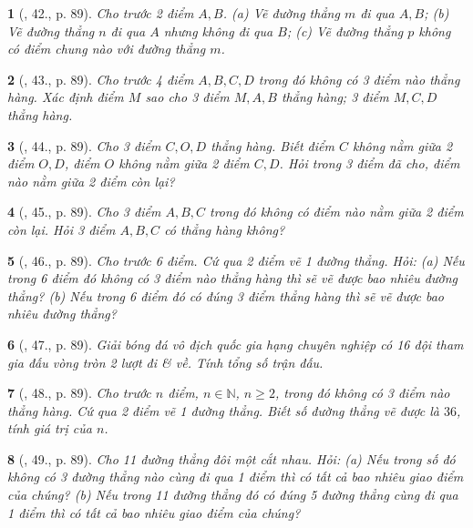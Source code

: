 \documentclass{article}
\newtheorem{baitoan}{}
\begin{document}
\begin{baitoan}[\cite{Tuyen_Toan_6}, 42., p. 89]
	Cho trước 2 điểm $A,B$. (a) Vẽ đường thẳng $m$ đi qua $A,B$; (b) Vẽ đường thẳng $n$ đi qua $A$ nhưng không đi qua $B$; (c) Vẽ đường thẳng $p$ không có điểm chung nào với đường thẳng $m$.
\end{baitoan}

\begin{baitoan}[\cite{Tuyen_Toan_6}, 43., p. 89]
	Cho trước 4 điểm $A,B,C,D$ trong đó không có 3 điểm nào thẳng hàng. Xác định điểm $M$ sao cho 3 điểm $M,A,B$ thẳng hàng; 3 điểm $M,C,D$ thẳng hàng.
\end{baitoan}

\begin{baitoan}[\cite{Tuyen_Toan_6}, 44., p. 89]
	Cho 3 điểm $C,O,D$ thẳng hàng. Biết điểm $C$ không nằm giữa 2 điểm $O,D$, điểm $O$ không nằm giữa 2 điểm $C,D$. Hỏi trong 3 điểm đã cho, điểm nào nằm giữa 2 điểm còn lại?
\end{baitoan}

\begin{baitoan}[\cite{Tuyen_Toan_6}, 45., p. 89]
	Cho 3 điểm $A,B,C$ trong đó không có điểm nào nằm giữa 2 điểm còn lại. Hỏi 3 điểm $A,B,C$ có thẳng hàng không?
\end{baitoan}

\begin{baitoan}[\cite{Tuyen_Toan_6}, 46., p. 89]
	Cho trước 6 điểm. Cứ qua 2 điểm vẽ 1 đường thẳng. Hỏi: (a) Nếu trong 6 điểm đó không có 3 điểm nào thẳng hàng thì sẽ vẽ được bao nhiêu đường thẳng? (b) Nếu trong 6 điểm đó có đúng 3 điểm thẳng hàng thì sẽ vẽ được bao nhiêu đường thẳng?
\end{baitoan}

\begin{baitoan}[\cite{Tuyen_Toan_6}, 47., p. 89]
	Giải bóng đá vô địch quốc gia hạng chuyên nghiệp có 16 đội tham gia đấu vòng tròn 2 lượt đi \& về. Tính tổng số trận đấu.
\end{baitoan}

\begin{baitoan}[\cite{Tuyen_Toan_6}, 48., p. 89]
	Cho trước $n$ điểm, $n\in\mathbb{N}$, $n\ge2$, trong đó không có 3 điểm nào thẳng hàng. Cứ qua 2 điểm vẽ 1 đường thẳng. Biết số đường thẳng vẽ được là $36$, tính giá trị của $n$.
\end{baitoan}

\begin{baitoan}[\cite{Tuyen_Toan_6}, 49., p. 89]
	Cho 11 đường thẳng đôi một cắt nhau. Hỏi: (a) Nếu trong số đó không có 3 đường thẳng nào cùng đi qua 1 điểm thì có tất cả bao nhiêu giao điểm của chúng? (b) Nếu trong 11 đường thẳng đó có đúng 5 đường thẳng cùng đi qua 1 điểm thì có tất cả bao nhiêu giao điểm của chúng?
\end{baitoan}
\end{document}
